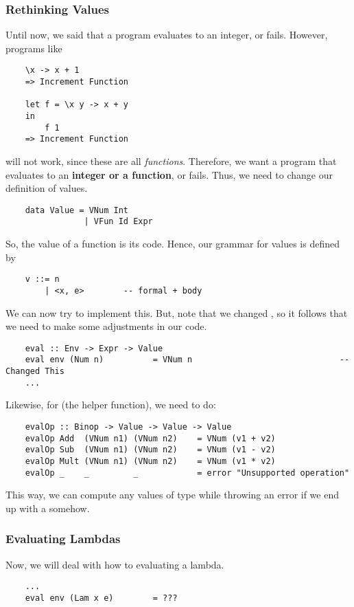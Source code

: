 \documentclass[letterpaper]{article}
\begin{document}
\subsubsection{Rethinking Values}
Until now, we said that a program evaluates to an integer, or fails. However, programs like 
\begin{verbatim}
    \x -> x + 1
    => Increment Function

    let f = \x y -> x + y 
    in 
        f 1
    => Increment Function\end{verbatim}
will not work, since these are all \emph{functions}. Therefore, we want a program that evaluates to an \textbf{integer or a function}, or fails. Thus, we need to change our definition of values. 
\begin{verbatim}
    data Value = VNum Int 
                | VFun Id Expr \end{verbatim}
So, the value of a function is its code. Hence, our grammar for values is defined by 
\begin{verbatim}
    v ::= n 
        | <x, e>        -- formal + body\end{verbatim}
We can now try to implement this. But, note that we changed , so it follows that we need to make some adjustments in our code. 
\begin{verbatim}
    eval :: Env -> Expr -> Value
    eval env (Num n)          = VNum n                              -- Changed This 
    ...\end{verbatim}
Likewise, for  (the helper function), we need to do:
\begin{verbatim}
    evalOp :: Binop -> Value -> Value -> Value 
    evalOp Add  (VNum n1) (VNum n2)    = VNum (v1 + v2) 
    evalOp Sub  (VNum n1) (VNum n2)    = VNum (v1 - v2)
    evalOp Mult (VNum n1) (VNum n2)    = VNum (v1 * v2) 
    evalOp _    _         _            = error "Unsupported operation" \end{verbatim}
This way, we can compute any values of type  while throwing an error if we end up with a  somehow. 


\subsubsection{Evaluating Lambdas}
Now, we will deal with how to evaluating a lambda. 
\begin{verbatim}
    ...
    eval env (Lam x e)        = ??? \end{verbatim}
\end{document}
